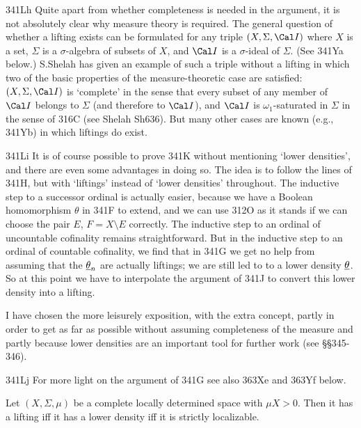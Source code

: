 {\spheader 341Lh Quite apart from whether completeness is needed in the
argument, it is not absolutely clear why measure theory is required.
The general question of whether a lifting exists can be formulated for
any triple $(X,\Sigma,\Cal I)$ where $X$ is a set, $\Sigma$ is a
$\sigma$-algebra of subsets of $X$, and $\Cal I$ is a $\sigma$-ideal of
$\Sigma$.   (See 341Ya below.)   S.Shelah has given an example of such a
triple without a lifting in which two of the basic
properties of the
measure-theoretic case are satisfied:  $(X,\Sigma,\Cal I)$ is
`complete' in the sense that every subset of any member of $\Cal I$
belongs to $\Sigma$ (and therefore to $\Cal I$), and $\Cal I$ is
$\omega_1$-saturated in $\Sigma$ in the sense of 316C (see {\smc Shelah
Sh636}).   But many other cases are known (e.g., 341Yb) in which liftings
do exist.

\spheader 341Li It is of course possible to prove 341K without
mentioning `lower densities', and there are even some advantages in
doing so.   The idea is to follow the lines of 341H, but with `liftings'
instead of `lower densities' throughout.   The inductive step to a
successor ordinal is actually easier, because we have a Boolean
homomorphism $\theta$ in 341F to extend, and we can use 312O as it
stands if we can choose the pair $E$, $F=X\setminus E$ correctly.   The
inductive step to an ordinal of uncountable cofinality remains
straightforward.   But in the inductive step to an ordinal of countable
cofinality, we find that in 341G we get no help from assuming that the
$\underline{\theta}_n$ are actually liftings;  we are still led to to a lower
density $\underline{\theta}$.   So at this point we have to interpolate the
argument of 341J to convert this lower density into a lifting.

I have chosen the more leisurely exposition, with the extra concept,
partly in order to get as far as possible without assuming completeness
of the measure and partly because lower densities are an important tool
for further work (see \S\S345-346).

\spheader 341Lj For more light on the argument of 341G see also 363Xe
and 363Yf below.
}%

 Let $(X,\Sigma,\mu)$ be a complete locally
determined space with $\mu X>0$.   Then it has a lifting iff it has a
lower density iff it is strictly localizable.

